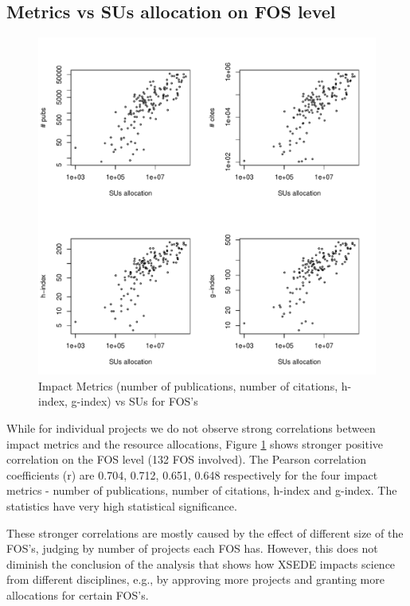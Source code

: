 \documentclass{sig-alternate}
\begin{document}
\subsection{Metrics vs SUs allocation on FOS level} 
 
\begin{figure}[!htb] 
  \centering 
    \includegraphics[width=1.0\columnwidth]{images/03_metrics_vs_alloc_fos.pdf} 
  \caption{Impact Metrics (number of publications, number of citations, h-index, g-index) vs SUs for FOS's}\label{F:metrics-vs-alloc-fos} 
\end{figure} 

While for individual projects we do not observe strong
correlations between impact metrics and the resource allocations,
Figure \ref {F:metrics-vs-alloc-fos} shows stronger positive
correlation on the FOS level (132 FOS involved). The Pearson
correlation coefficients (r) are 0.704, 0.712, 0.651, 0.648
respectively for the four impact metrics - number of publications,
number of citations, h-index and g-index. The statistics have very
high statistical significance.

These stronger correlations are mostly caused by the effect of
different size of the FOS's, judging by number of projects each FOS
has. However, this does not diminish the conclusion of the analysis
that shows how XSEDE impacts science from different disciplines, e.g.,
by approving more projects and granting more allocations for certain
FOS's.
 
\end{document}
